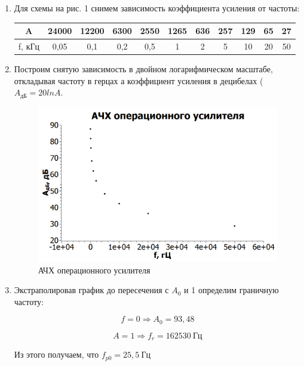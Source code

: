 \documentclass[a4paper, 12pt]{article}%
\begin{document}
\begin{enumerate}

\item Для схемы на рис. 1 снимем зависимость коэффициента усиления от частоты:

\begin{center}
\begin{tabular}{|c|c|c|c|c|c|c|c|c|c|c|}
\hline 
A & 24000 & 12200 & 6300 & 2550 & 1265 & 636 & 257 & 129 & 65 & 27 \\ 
\hline 
f, кГц & 0,05 & 0,1 & 0,2 & 0,5 & 1 & 2 & 5 & 10 & 20 & 50 \\ 
\hline 
\end{tabular} 
\end{center}

\item Построим снятую зависимость в двойном логарифмическом масштабе, откладывая частоту в герцах а коэффициент усиления в децибелах ($A_{\text{дБ}} = 20lnA$.

\begin{figure}[h!]
\centering
\includegraphics[scale=0.6]{images/graph_1.png}
\caption{АЧХ операционного усилителя}
\label{fig:graph_1}
\end{figure}

\item Экстраполировав график до пересечения с $A_0$ и 1 определим граничную частоту:

\[f = 0 \Rightarrow A_0 = 93,48\]

\[A = 1 \Rightarrow f_r = 162530 \: \text{Гц}\]

Из этого получаем, что $f_{p0} = 25,5 \: \text{Гц}$

\end{enumerate}
\end{document}

